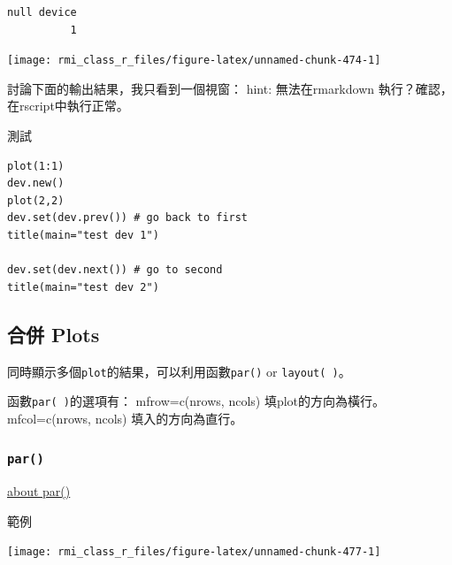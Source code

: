\documentclass[]{book}
\newenvironment{Shaded}{\begin{snugshade}}{\end{snugshade}}
\newcommand{\KeywordTok}[1]{\textcolor[rgb]{0.13,0.29,0.53}{\textbf{#1}}}
\newcommand{\NormalTok}[1]{#1}
\newcommand{\OperatorTok}[1]{\textcolor[rgb]{0.81,0.36,0.00}{\textbf{#1}}}
\theoremstyle{definition}
\theoremstyle{definition}
\theoremstyle{definition}
\theoremstyle{remark}
\begin{document}
\begin{verbatim}
null device 
          1 
\end{verbatim}

\begin{center}\texttt{[image: rmi\_class\_r\_files/figure-latex/unnamed-chunk-474-1]} \end{center}

討論下面的輸出結果，我只看到一個視窗： hint: 無法在rmarkdown
執行？確認，在rscript中執行正常。

\begin{Shaded}
\end{Shaded}

測試

\begin{verbatim}
plot(1:1)
dev.new()
plot(2,2)
dev.set(dev.prev()) # go back to first
title(main="test dev 1")

dev.set(dev.next()) # go to second
title(main="test dev 2")
\end{verbatim}

\hypertarget{-plots}{%
\subsection{合併 Plots}\label{-plots}}

同時顯示多個\texttt{plot}的結果，可以利用函數\texttt{par()} or
\texttt{layout(\ )}。

函數\texttt{par(\ )}的選項有： mfrow=c(nrows, ncols)
填plot的方向為橫行。\\
mfcol=c(nrows, ncols) 填入的方向為直行。

\hypertarget{par}{%
\subsubsection{\texorpdfstring{\texttt{par()}}{par()}}\label{par}}

\href{https://thepracticalr.wordpress.com/tag/plotting/}{about par()}

範例

\begin{center}\texttt{[image: rmi\_class\_r\_files/figure-latex/unnamed-chunk-477-1]} \end{center}
\end{document}
